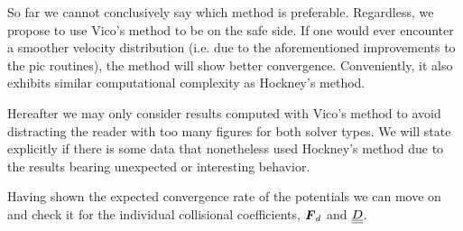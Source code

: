 So far we cannot conclusively say which method is preferable. Regardless, we propose to
use Vico's method to be on the safe side. If one would ever encounter a smoother velocity
distribution (i.e. due to the aforementioned improvements to the \gls{pic} routines), the method
will show better convergence. Conveniently, it also exhibits similar computational complexity as Hockney's
method.

Hereafter we may only consider results computed with Vico's method to avoid distracting the reader with too many figures for both solver types.
We will state explicitly if there is some data that nonetheless used Hockney's 
method due to the results bearing unexpected or interesting behavior.

Having shown the expected convergence rate of the potentials we can move on and check it for the
individual collisional coefficients, $\boldsymbol{F}_d$ and $\underline{\underline{D}}$.

